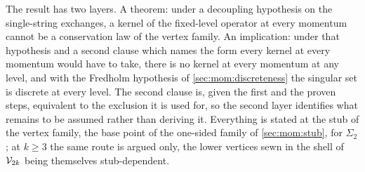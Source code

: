 The result has two layers.
A theorem: under a decoupling hypothesis on the single-string exchanges, a kernel of the fixed-level operator at every momentum cannot be a conservation law of the vertex family.
An implication: under that hypothesis and a second clause which names the form every kernel at every momentum would have to take, there is no kernel at every momentum at any level, and with the Fredholm hypothesis of \cref{sec:mom:discreteness} the singular set is discrete at every level.
The second clause is, given the first and the proven steps, equivalent to the exclusion it is used for, so the second layer identifies what remains to be assumed rather than deriving it.
Everything is stated at the stub of the vertex family, the base point of the one-sided family of \cref{sec:mom:stub}, for $\Sigma_2$; at $k \ge 3$ the same route is argued only, the lower vertices sewn in the shell of $\mathcal{V}_{2 k}$ being themselves stub-dependent.

